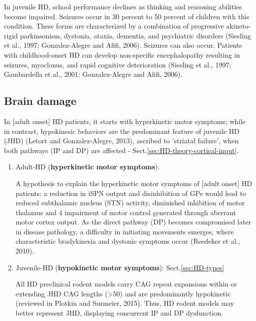In juvenile HD, school performance declines as thinking and reasoning abilities
become impaired. Seizures occur in 30 percent to 50 percent of children with
this condition. These forms are characterized by a combination of progressive
akineto-rigid parkinsonism, dystonia, ataxia, dementia, and psychiatric
disorders (Siesling et al., 1997; Gonzalez-Alegre and Afifi, 2006). Seizures can
also occur. Patients with childhood-onset HD can develop non-specific
encephalopathy resulting in seizures, myoclonus, and rapid cognitive
deterioration (Siesling et al., 1997; Gambardella et al., 2001; Gonzalez-Alegre
and Afifi, 2006).




\subsection{Brain damage}


In [adult onset] HD patients, it starts with hyperkinetic motor symptoms; while
in contrast, hypokinesic behaviors are the predominant feature of juvenile HD
(JHD) (Letort and Gonzalez-Alegre, 2013), ascribed to 'striatal failure', when
both pathways (IP and DP) are affected -
Sect.\ref{sec:HD-theory-cortical-input}.

\begin{enumerate}
  \item Adult-HD ({\bf hyperkinetic motor symptoms}):

  
A hypothesis to explain the hyperkinetic motor symptoms of [adult onset] HD
patients: a reduction in iSPN output and disinhibition of GPe would lead to
reduced subthalamic nucleus (STN) activity, diminished inhibition of motor
thalamus and 4 impairment of motor control generated through aberrant motor
cortex output. As the direct pathway (DP) becomes compromised later in disease
pathology, a difficulty in initiating movements emerges, where characteristic
bradykinesia and dystonic symptoms occur (Reedeker et al., 2010).

  \item Juvenile-HD ({\bf hypokinetic motor symptoms}): Sect.\ref{sec:HD-types}
  
All HD preclinical rodent models carry CAG repeat expansions within or extending
JHD CAG lengths (>50) and are predominantly hypokinetic (reviewed in Plotkin and
Surmeier, 2015). Thus, HD rodent models may better represent JHD, displaying
concurrent IP and DP dysfunction.

\end{enumerate}

